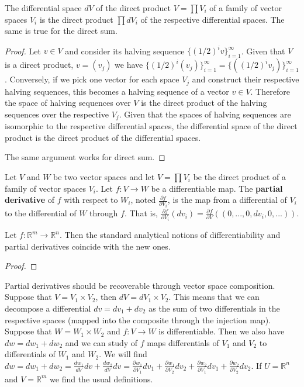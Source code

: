 \begin{prop}
	The differential space $dV$ of the direct product $V=\prod V_i$ of a family of vector spaces $V_i$ is the direct product $\prod dV_i$ of the respective differential spaces. The same is true for the direct sum.
\end{prop}

\begin{proof}
	Let $v \in V$ and consider its halving sequence $\{(1/2)^i v\}_{i=1}^{\infty}$. Given that $V$ is a direct product, $v=(v_j)$ we have $\{(1/2)^i (v_j)\}_{i=1}^{\infty} = \{((1/2)^i v_j)\}_{i=1}^{\infty}$. Conversely, if we pick one vector for each space $V_j$ and construct their respective halving sequences, this becomes a halving sequence of a vector $v \in V$. Therefore the space of halving sequences over $V$ is the direct product of the halving sequences over the respective $V_j$. Given that the spaces of halving sequences are isomorphic to the respective differential spaces, the differential space of the direct product is the direct product of the differential spaces.
	
	The same argument works for direct sum.
\end{proof}

\begin{defn}
	Let $V$ and $W$ be two vector spaces and let $V=\prod V_i$ be the direct product of a family of vector spaces $V_i$. Let $f: V \to W$ be a differentiable map. The \textbf{partial derivative} of $f$ with respect to $W_i$, noted $\frac{\partial f}{\partial V_i}$, is the map from a differential of $V_i$ to the differential of $W$ through $f$. That is, $\frac{\partial f}{\partial V_i} (dv_i) = \frac{\partial f}{\partial V} \left( (0, ..., 0, dv_i, 0, ...) \right)$.
\end{defn}

\begin{prop}
	Let $f:\mathbb{R}^m \to \mathbb{R}^n$. Then the standard analytical notions of differentiability and partial derivatives coincide with the new ones.
\end{prop}

\begin{proof}
\end{proof}


\begin{remark}
	Partial derivatives should be recoverable through vector space composition. Suppose that $V = V_1 \times V_2$, then $dV = dV_1 \times V_2$. This means that we can decompose a differential $dv= dv_1 + dv_2$ as the sum of two differentials in the respective spaces (mapped into the composite through the injection map). Suppose that $W = W_1 \times W_2$ and $f : V \to W$ is differentiable. Then we also have $dw= dw_1 + dw_2$ and we can study of $f$ maps differentials of $V_1$ and $V_2$ to differentials of $W_1$ and $W_2$. We will find $dw = dw_1 + dw_2 = \frac{dw_1}{dV} dv + \frac{dw_2}{dV} dv = \frac{\partial w_1}{\partial V_1} dv_1 + \frac{\partial w_1}{\partial V_2} dv_2 + \frac{\partial w_2}{\partial V_1} dv_1 + \frac{\partial w_2}{\partial V_2} dv_2$. If $U = \mathbb{R}^n$ and $V = \mathbb{R}^m$ we find the usual definitions.
\end{remark}



